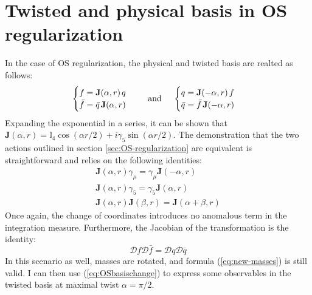 \documentclass[english, LaM, oneside, noexaminfo]{sapthesis}
\begin{document}
\section{Twisted and physical basis in OS regularization}
\noindent
In the case of OS regularization, the physical and twisted basis are realted as follows:
\begin{equation*}\label{eq:OSbasischange}
    \begin{cases}
        f =  \mathbf{J}(\alpha, r)\hspace*{.5mm} q \\
        \bar f = \bar q \hspace*{.5mm} \mathbf{J}(\alpha, r)
    \end{cases}
    \quad \text{ and } \quad
    \begin{cases}
        q =  \mathbf{J}(-\alpha, r)\hspace*{.5mm} f \\
        \bar q = \bar f \hspace*{.5mm} \mathbf{J}(-\alpha, r)
    \end{cases}
\end{equation*}
Expanding the exponential in a series, it can be shown that $\mathbf{J} (\alpha, r) = \mathbb{I}_4 \cos (\alpha r/2) + i \gamma_5 \sin (\alpha r/2)$.
The demonstration that the two actions outlined in section \ref{sec:OS-regularization} are equivalent is straightforward and relies on the following identities:
\begin{equation*}
    \begin{gathered}
        \mathbf{J}(\alpha,r) \gamma_\mu = \gamma_\mu \mathbf{J}(-\alpha,r) \\
        \mathbf{J}(\alpha,r) \gamma_5 = \gamma_5 \mathbf{J}(\alpha,r) \\
        \mathbf{J}(\alpha,r) \mathbf{J}(\beta,r) = \mathbf{J}(\alpha+\beta,r) 
    \end{gathered}
\end{equation*}
Once again, the change of coordinates introduces no anomalous term in the integration measure.
Furthermore, the Jacobian of the transformation is the identity:
\begin{equation*}
    \mathcal{D} f \mathcal{D} \bar f = \mathcal{D} q \mathcal{D} \bar q
\end{equation*}
In this scenario as well, masses are rotated, and formula (\ref{eq:new-masses}) is still valid.
I can then use (\ref{eq:OSbasischange}) to express some observables in the twisted basis at maximal twist $\alpha = \pi/2$.
\end{document}
